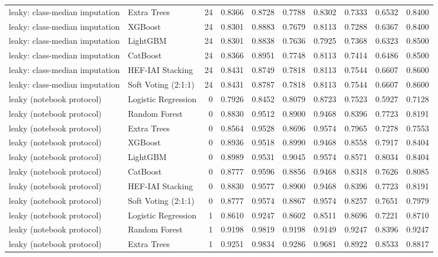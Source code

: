 \begin{tabular}{llrrrrrrrr}
leaky: class-median imputation & Extra Trees & 24 & 0.8366 & 0.8728 & 0.7788 & 0.8302 & 0.7333 & 0.6532 & 0.8400 \\
leaky: class-median imputation & XGBoost & 24 & 0.8301 & 0.8883 & 0.7679 & 0.8113 & 0.7288 & 0.6367 & 0.8400 \\
leaky: class-median imputation & LightGBM & 24 & 0.8301 & 0.8838 & 0.7636 & 0.7925 & 0.7368 & 0.6323 & 0.8500 \\
leaky: class-median imputation & CatBoost & 24 & 0.8366 & 0.8951 & 0.7748 & 0.8113 & 0.7414 & 0.6486 & 0.8500 \\
leaky: class-median imputation & HEF-IAI Stacking & 24 & 0.8431 & 0.8749 & 0.7818 & 0.8113 & 0.7544 & 0.6607 & 0.8600 \\
leaky: class-median imputation & Soft Voting (2:1:1) & 24 & 0.8431 & 0.8787 & 0.7818 & 0.8113 & 0.7544 & 0.6607 & 0.8600 \\
leaky (notebook protocol) & Logistic Regression & 0 & 0.7926 & 0.8452 & 0.8079 & 0.8723 & 0.7523 & 0.5927 & 0.7128 \\
leaky (notebook protocol) & Random Forest & 0 & 0.8830 & 0.9512 & 0.8900 & 0.9468 & 0.8396 & 0.7723 & 0.8191 \\
leaky (notebook protocol) & Extra Trees & 0 & 0.8564 & 0.9528 & 0.8696 & 0.9574 & 0.7965 & 0.7278 & 0.7553 \\
leaky (notebook protocol) & XGBoost & 0 & 0.8936 & 0.9518 & 0.8990 & 0.9468 & 0.8558 & 0.7917 & 0.8404 \\
leaky (notebook protocol) & LightGBM & 0 & 0.8989 & 0.9531 & 0.9045 & 0.9574 & 0.8571 & 0.8034 & 0.8404 \\
leaky (notebook protocol) & CatBoost & 0 & 0.8777 & 0.9596 & 0.8856 & 0.9468 & 0.8318 & 0.7626 & 0.8085 \\
leaky (notebook protocol) & HEF-IAI Stacking & 0 & 0.8830 & 0.9577 & 0.8900 & 0.9468 & 0.8396 & 0.7723 & 0.8191 \\
leaky (notebook protocol) & Soft Voting (2:1:1) & 0 & 0.8777 & 0.9574 & 0.8867 & 0.9574 & 0.8257 & 0.7651 & 0.7979 \\
leaky (notebook protocol) & Logistic Regression & 1 & 0.8610 & 0.9247 & 0.8602 & 0.8511 & 0.8696 & 0.7221 & 0.8710 \\
leaky (notebook protocol) & Random Forest & 1 & 0.9198 & 0.9819 & 0.9198 & 0.9149 & 0.9247 & 0.8396 & 0.9247 \\
leaky (notebook protocol) & Extra Trees & 1 & 0.9251 & 0.9834 & 0.9286 & 0.9681 & 0.8922 & 0.8533 & 0.8817 \\

\end{tabular}
